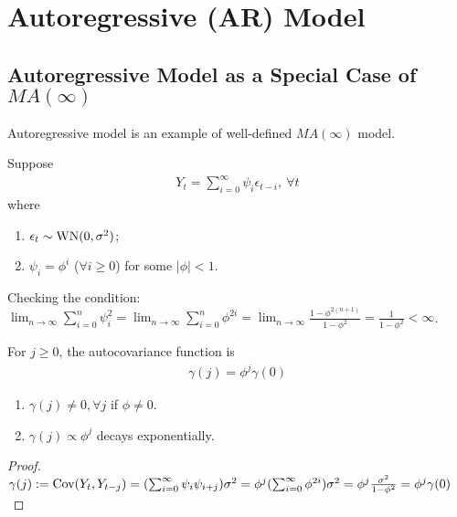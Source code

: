 \documentclass[11pt]{elegantbook}
\begin{document}
\section{Autoregressive (AR) Model}
\subsection{Autoregressive Model as a Special Case of $MA(\infty)$}
Autoregressive model is an example of well-defined $MA(\infty)$ model.
\begin{example}
    Suppose
    \begin{equation}
        \begin{aligned}
            Y_{t}=\sum_{i=0}^\infty \psi_i\epsilon_{t-i},\ \forall t
        \end{aligned}
        \nonumber
    \end{equation}
    where
    \begin{enumerate}[$\circ$]
        \item $\epsilon_t\sim \textnormal{WN}(0,\sigma^2)$;
        \item $\psi_i=\phi^i$ ($\forall i\geq 0$) for some $|\phi|<1$.
    \end{enumerate}
\end{example}
Checking the condition: $\lim_{n \rightarrow \infty}\sum_{i=0}^n\psi_i^2=\lim_{n \rightarrow \infty}\sum_{i=0}^n\phi^{2i}=\lim_{n \rightarrow \infty}\frac{1-\phi^{2(n+1)}}{1-\phi^2}=\frac{1}{1-\phi^2}<\infty$.

\begin{lemma}
    For $j\geq 0$, the autocovariance function is
    \begin{equation}
        \begin{aligned}
            \gamma(j)=\phi^j \gamma(0)
        \end{aligned}
        \nonumber
    \end{equation}
    \begin{note}
        \begin{enumerate}
            \item $\gamma(j)\neq 0, \forall j$ if $\phi\neq 0$.
            \item $\gamma(j)\propto \phi^j$ decays exponentially.
        \end{enumerate}
    \end{note}
\end{lemma}
\begin{proof}
    $\gamma(j):=\textnormal{Cov}(Y_t,Y_{t-j})=(\sum_{i=0}^{\infty}\psi_i\psi_{i+j})\sigma^2=\phi^{j}(\sum_{i=0}^{\infty}\phi^{2i})\sigma^2=\phi^j\frac{\sigma^2}{1-\phi^2}=\phi^j \gamma(0)$
\end{proof}
\end{document}
